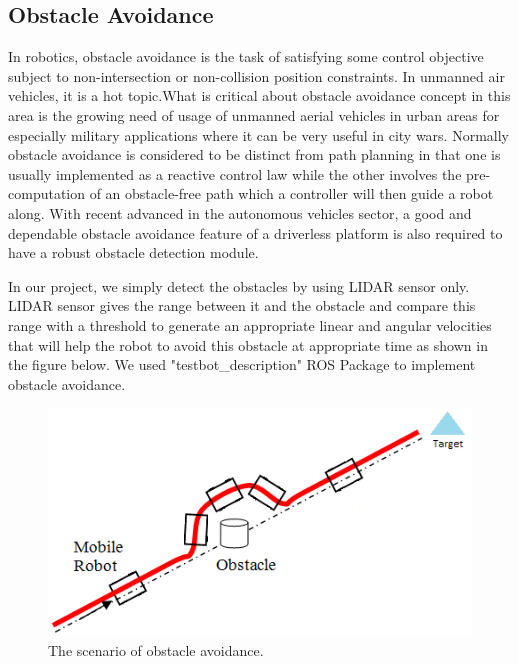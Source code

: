\subsection{Obstacle Avoidance}
\hspace{2cm} In robotics, obstacle avoidance is the task of satisfying some control objective subject to non-intersection or non-collision position constraints. In unmanned air vehicles, it is a hot topic.What is critical about obstacle avoidance concept in this area is the growing need of usage of unmanned aerial vehicles in urban areas for especially military applications where it can be very useful in city wars. Normally obstacle avoidance is considered to be distinct from path planning in that one is usually implemented as a reactive control law while the other involves the pre-computation of an obstacle-free path which a controller will then guide a robot along. With recent advanced in the autonomous vehicles sector, a good and dependable obstacle avoidance feature of a driverless platform is also required to have a robust obstacle detection module.\cite{web038}

\par
In our project, we simply detect the obstacles by using LIDAR sensor only. LIDAR sensor gives the range between it and the obstacle and compare this range with a threshold to generate an appropriate linear and angular velocities that will help the robot to avoid this obstacle at appropriate time as shown in the figure below.
We used "testbot\_description" ROS Package to implement obstacle avoidance.
\par


 \begin{figure}[H]%
    \center%
    \includegraphics[width=.8\textwidth]{images/Alaa/Obstacle-avoidance.png}%
    \caption[obstacle avoidance]{The scenario of obstacle avoidance.}\label{fig: obstacle avoidance}%
  \end{figure}
 